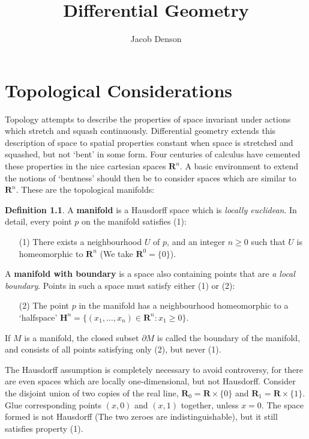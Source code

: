 \documentclass[12pt]{report}
\title{Differential Geometry}
\author{Jacob Denson}
\theoremstyle{plain}
\theoremstyle{definition}
\newtheorem*{defi}{Definition}
\newenvironment{definition}
    {\begin{samepage}\begin{framed}\begin{defi}}
    {\end{defi}\end{framed}\end{samepage}}
\begin{document}

\maketitle

\tableofcontents


\chapter{Topological Considerations}

Topology attempts to describe the properties of space invariant under actions which stretch and squash continuously. Differential geometry extends this description of space to spatial properties constant when space is stretched and squashed, but not `bent' in some form. Four centuries of calculus have cemented these properties in the nice cartesian spaces $\mathbf{R}^n$. A basic environment to extend the notions of `bentness' should then be to consider spaces which are similar to $\mathbf{R}^n$. These are the topological manifolds:

\begin{definition}
    A {\bf manifold} is a Hausdorff space which is {\it locally euclidean}. In detail, every point $p$ on the manifold satisfies (1):
    \begin{enumerate}
        \item[(1)] There exists a neighbourhood $U$ of $p$, and an integer $n \geq 0$ such that $U$ is homeomorphic to $\mathbf{R}^n$ (We take $\mathbf{R}^0 = \{0\}$).
    \end{enumerate}
    A {\bf manifold with boundary} is a space also containing points that are {\it a local boundary}. Points in such a space must satisfy either (1) or (2):
    \begin{enumerate}
        \item[(2)] The point $p$ in the manifold has a neighbourhood homeomorphic to a `halfspace' $\mathbf{H}^n = \{ (x_1, \dots, x_n) \in \mathbf{R}^n: x_1 \geq 0 \}$.
    \end{enumerate}
    If $M$ is a manifold, the closed subset $\partial M$ is called the boundary of the manifold, and consists of all points satisfying only (2), but never (1).
\end{definition}

The Hausdorff assumption is completely necessary to avoid controversy, for there are even spaces which are locally one-dimensional, but not Hausdorff. Consider the disjoint union of two copies of the real line, $\mathbf{R}_0 = \mathbf{R} \times \{0\}$ and $\mathbf{R}_1 = \mathbf{R} \times \{1\}$. Glue corresponding points $(x,0)$ and $(x,1)$ together, unless $x = 0$. The space formed is not Hausdorff (The two zeroes are indistinguishable), but it still satisfies property (1).
\end{document}
